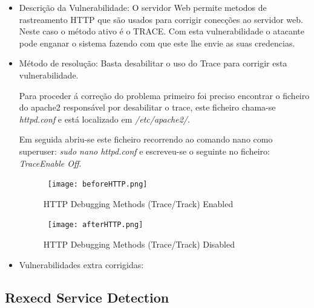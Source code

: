 \begin{itemize}
\item Descrição da Vulnerabilidade: O servidor Web permite metodos de rastreamento HTTP que são usados para corrigir conecções ao servidor web.
Neste caso o método ativo é o TRACE. Com esta vulnerabilidade o atacante pode enganar o sistema fazendo com que este lhe envie as suas credencias.

\item Método de resolução: Basta desabilitar o uso do Trace para corrigir esta vulnerabilidade.

\par Para proceder á correção do problema primeiro foi preciso encontrar o ficheiro do apache2 responsável por desabilitar o trace, este ficheiro chama-se \textit{httpd.conf} e está localizado em \textit{/etc/apache2/}.
\par Em seguida abriu-se este ficheiro recorrendo ao comando nano como superuser: \textit{sudo nano httpd.conf} e escreveu-se o seguinte no ficheiro: \textit{TraceEnable Off}.

\begin{figure}[H]

  \centering

  \hbox{\hspace{-6em} \texttt{[image: beforeHTTP.png]}}

  \caption {HTTP Debugging Methods (Trace/Track) Enabled}

  \label {fig3}

\end{figure}
\begin{figure}[H]

  \centering

  \hbox{\hspace{-6em} \texttt{[image: afterHTTP.png]}}

  \caption {HTTP Debugging Methods (Trace/Track) Disabled}

  \label {fig3}

\end{figure}
\item Vulnerabilidades extra corrigidas:
\end{itemize}

\subsection{Rexecd Service Detection}


